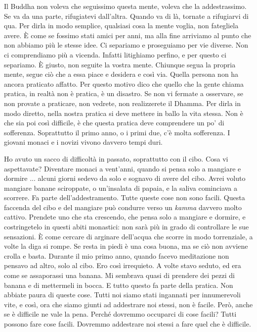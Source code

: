Il Buddha non voleva che seguissimo questa mente, voleva che la
addestrassimo. Se va da una parte, rifugiatevi dall'altra. Quando va di
là, tornate a rifugiarvi di qua. Per dirla in modo semplice, qualsiasi
cosa la mente voglia, non fategliela avere. È come se fossimo stati
amici per anni, ma alla fine arriviamo al punto che non abbiamo più le
stesse idee. Ci separiamo e proseguiamo per vie diverse. Non ci
comprendiamo più a vicenda. Infatti litighiamo perfino, e per questo ci
separiamo. È giusto, non seguite la vostra mente. Chiunque segua la
propria mente, segue ciò che a essa piace e desidera e così via. Quella
persona non ha ancora praticato affatto. Per questo motivo dico che
quello che la gente chiama pratica, in realtà non è pratica, è un
disastro. Se non vi fermate a osservare, se non provate a praticare, non
vedrete, non realizzerete il Dhamma. Per dirla in modo diretto, nella
nostra pratica si deve mettere in ballo la vita stessa. Non è che sia
poi così difficile, è che questa pratica deve comprendere un po' di
sofferenza. Soprattutto il primo anno, o i primi due, c'è molta
sofferenza. I giovani monaci e i novizi vivono davvero tempi duri.

Ho avuto un sacco di difficoltà in passato, soprattutto con il cibo.
Cosa vi aspettavate? Diventare monaci a vent'anni, quando si pensa solo
a mangiare e dormire ... alcuni giorni sedevo da solo e sognavo di avere
del cibo. Avrei voluto mangiare banane sciroppate, o un'insalata di
papaia, e la saliva cominciava a scorrere. Fa parte dell'addestramento.
Tutte queste cose non sono facili. Questa faccenda del cibo e del
mangiare può condurre verso un \emph{kamma} davvero molto cattivo.
Prendete uno che sta crescendo, che pensa solo a mangiare e dormire, e
costringetelo in questi abiti monastici: non sarà più in grado di
controllare le sue sensazioni. È come cercare di arginare dell'acqua che
scorre in modo torrenziale, a volte la diga si rompe. Se resta in piedi
è una cosa buona, ma se ciò non avviene crolla e basta. Durante il mio
primo anno, quando facevo meditazione non pensavo ad altro, solo al
cibo. Ero così irrequieto. A volte stavo seduto, ed era come se
assaporassi una banana. Mi sembrava quasi di prendere dei pezzi di
banana e di mettermeli in bocca. E tutto questo fa parte della pratica.
Non abbiate paura di queste cose. Tutti noi siamo stati ingannati per
innumerevoli vite, e così, ora che siamo giunti ad addestrare noi
stessi, non è facile. Però, anche se è difficile ne vale la pena. Perché
dovremmo occuparci di cose facili? Tutti possono fare cose facili.
Dovremmo addestrare noi stessi a fare quel che è difficile.

